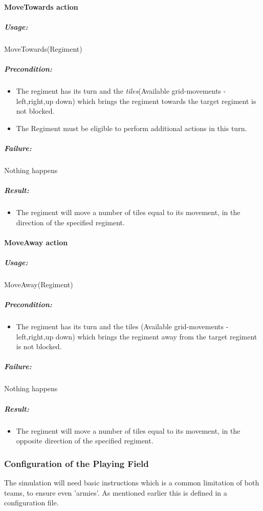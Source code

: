 		\paragraph{MoveTowards action}
		\subparagraph{Usage:} 
		MoveTowards(Regiment)
		
		\subparagraph{Precondition:} 
		\begin{itemize}\itemsep0.0001cm
			\item The regiment has its turn and the \textit{tiles}(Available grid-movements - left,right,up down) 
		which brings the regiment towards the target regiment is not blocked.
			\item The Regiment must be eligible to perform additional actions in this turn.
		\end{itemize}
		
		\subparagraph{Failure:} 
		Nothing happens \\
		
		\subparagraph{Result:}
		\begin{itemize}\itemsep0.0001cm
		\item The regiment will move a number of tiles equal to its movement, in the direction of the specified regiment.
		\end{itemize}
		
		\paragraph{MoveAway action}
		\subparagraph{Usage:} 
		MoveAway(Regiment)
		
		\subparagraph{Precondition:} 
		\begin{itemize}\itemsep0.0001cm
		\item The regiment has its turn and the tiles (Available grid-movements - left,right,up down)
		which brings the regiment away from the target regiment is not blocked.
		\end{itemize}
		
		\subparagraph{Failure:} 
		Nothing happens
		
		\subparagraph{Result:}
		\begin{itemize}\itemsep0.0001cm
			\item The regiment will move a number of tiles equal to its movement, in the opposite direction of the specified regiment.
		\end{itemize}
				
		\subsubsection{Configuration of the Playing Field}
		The simulation will need basic instructions which is a common limitation of both teams, to ensure even 'armies'. 
		As mentioned earlier this is defined in a configuration file.
		
